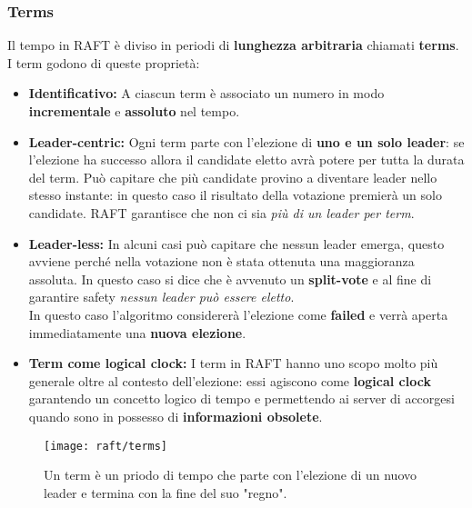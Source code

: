   \subsubsection{Terms}
  Il tempo in RAFT è diviso in periodi di \textbf{lunghezza arbitraria} chiamati \textbf{terms}. I term godono di queste proprietà:
  \begin{itemize}
    \item{\textbf{Identificativo:}}
    A ciascun term è associato un numero in modo \textbf{incrementale} e \textbf{assoluto} nel tempo.
    \item{\textbf{Leader-centric:}}
    Ogni term parte con l'elezione di \textbf{uno e un solo leader}: se l'elezione ha successo allora il candidate eletto avrà potere per tutta la durata del term. Può capitare che più candidate provino a diventare leader nello stesso instante: in questo caso il risultato della votazione premierà un solo candidate. RAFT garantisce che non ci sia \textit{più di un leader per term}.
    \item{\textbf{Leader-less:}}
    In alcuni casi può capitare che nessun leader emerga, questo avviene perché nella votazione non è stata ottenuta una maggioranza assoluta. In questo caso si dice che è avvenuto un \textbf{split-vote} e al fine di garantire safety \textit{nessun leader può essere eletto}.\\
    In questo caso l'algoritmo considererà l'elezione come \textbf{failed} e verrà aperta immediatamente una \textbf{nuova elezione}.
    \item{\textbf{Term come logical clock:}}
    I term in RAFT hanno uno scopo molto più generale oltre al contesto dell'elezione: essi agiscono come \textbf{logical clock} \cite[Lamport:1978]{Lamport:1978} garantendo un concetto logico di tempo e permettendo ai server di accorgesi quando sono in possesso di \textbf{informazioni obsolete}.
  \end{itemize}
  
  \begin{figure}[H]
    \centering
    \texttt{[image: raft/terms]}
    \caption{Un term è un priodo di tempo che parte con l'elezione di un nuovo leader e termina con la fine del suo "regno".}
    \label{fig:figure3}
  \end{figure}

